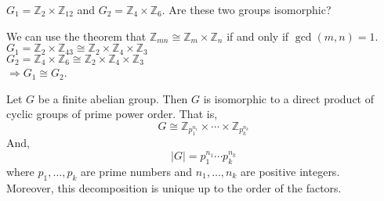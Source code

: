 
\begin{exercise}
    $G_1 = \mathbb{Z}_2 \times \mathbb{Z}_{12}$ and $G_2 = \mathbb{Z}_4 \times \mathbb{Z}_6$.
    Are these two groups isomorphic?
\end{exercise}
\begin{answer}
    We can use the theorem that $\mathbb{Z}_{mn} \cong \mathbb{Z}_m \times \mathbb{Z}_n$ if and only if $\gcd(m,n) = 1$.\\
    $G_1 = \mathbb{Z}_2 \times \mathbb{Z}_{43} \cong \mathbb{Z}_2 \times \mathbb{Z}_4 \times \mathbb{Z}_3$\\
    $G_2 = \mathbb{Z}_4 \times \mathbb{Z}_6 \cong \mathbb{Z}_2 \times \mathbb{Z}_4 \times \mathbb{Z}_3$\\
    $\Rightarrow G_1 \cong G_2$.
\end{answer}

\begin{theorem}
    Let $G$ be a finite abelian group. Then $G$ is isomorphic to a direct product of cyclic groups of prime power order. 
    That is, 
    \[G \cong \mathbb{Z}_{p_1^{n_1}} \times \cdots \times \mathbb{Z}_{p_k^{n_k}}\]
    And, 
    \[|G| = p_1^{n_1} \cdots p_k^{n_k}\]
    where $p_1, \ldots, p_k$ are prime numbers and $n_1, \ldots, n_k$ are positive integers.\\
    Moreover, this decomposition is unique up to the order of the factors.
\end{theorem}

